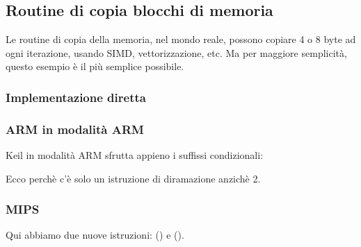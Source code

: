 ﻿\subsection{Routine di copia blocchi di memoria}
\label{loop_memcpy}

Le routine di copia della memoria, nel mondo reale, possono copiare 4 o 8 byte ad ogni iterazione, usando \ac{SIMD}, 
vettorizzazione, etc.
Ma per maggiore semplicità, questo esempio è il più semplice possibile.



\subsubsection{Implementazione diretta}







\subsubsection{ARM in modalità ARM}

Keil in modalità ARM sfrutta appieno i suffissi condizionali:



Ecco perchè c'è solo un istruzione di diramazione anzichè 2.

\subsubsection{MIPS}




Qui abbiamo due nuove istruzioni:  () e  ().

